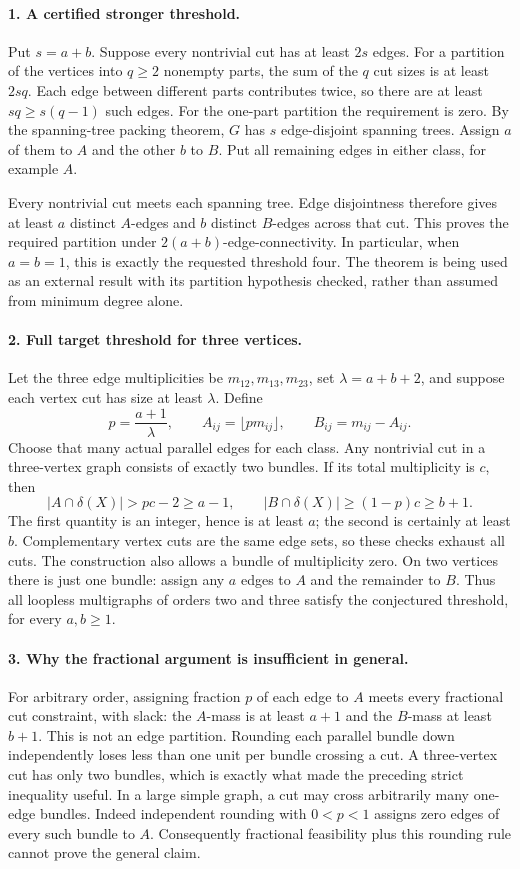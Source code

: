 \documentclass[11pt,a4paper]{article}
\begin{document}
\paragraph{1. A certified stronger threshold.}
Put $s=a+b$. Suppose every nontrivial cut has at least $2s$ edges.
For a partition of the vertices into $q\ge2$ nonempty parts, the sum
of the $q$ cut sizes is at least $2sq$. Each edge between different
parts contributes twice, so there are at least $sq\ge s(q-1)$
such edges. For the one-part partition the requirement is zero.
By the spanning-tree packing theorem, $G$ has $s$ edge-disjoint
spanning trees. Assign $a$ of them to $A$ and the other $b$ to $B$.
Put all remaining edges in either class, for example $A$.

Every nontrivial cut meets each spanning tree. Edge disjointness
therefore gives at least $a$ distinct $A$-edges and $b$ distinct
$B$-edges across that cut. This proves the required partition under
$2(a+b)$-edge-connectivity. In particular, when $a=b=1$, this is exactly
the requested threshold four. The theorem is being used as an external
result with its partition hypothesis checked, rather than assumed from
minimum degree alone.

\paragraph{2. Full target threshold for three vertices.}
Let the three edge multiplicities be $m_{12},m_{13},m_{23}$, set
$\lambda=a+b+2$, and suppose each vertex cut has size at least
$\lambda$. Define
\[
 p=\frac{a+1}{\lambda},\qquad
 A_{ij}=\lfloor p m_{ij}\rfloor,\qquad
 B_{ij}=m_{ij}-A_{ij}.
\]
Choose that many actual parallel edges for each class. Any nontrivial
cut in a three-vertex graph consists of exactly two bundles. If its
total multiplicity is $c$, then
\[
 |A\cap\delta(X)|>pc-2\ge a-1,
 \qquad |B\cap\delta(X)|\ge(1-p)c\ge b+1.
\]
The first quantity is an integer, hence is at least $a$; the second
is certainly at least $b$. Complementary vertex cuts are the same
edge sets, so these checks exhaust all cuts. The construction also
allows a bundle of multiplicity zero. On two vertices there is just
one bundle: assign any $a$ edges to $A$ and the remainder to $B$.
Thus all loopless multigraphs of orders two and three satisfy the
conjectured threshold, for every $a,b\ge1$.

\paragraph{3. Why the fractional argument is insufficient in general.}
For arbitrary order, assigning fraction $p$ of each edge to $A$ meets
every fractional cut constraint, with slack: the $A$-mass is at least
$a+1$ and the $B$-mass at least $b+1$. This is not an edge partition.
Rounding each parallel bundle down independently loses less than one
unit per bundle crossing a cut. A three-vertex cut has only two
bundles, which is exactly what made the preceding strict inequality
useful. In a large simple graph, a cut may cross arbitrarily many
one-edge bundles. Indeed independent rounding with $0<p<1$ assigns
zero edges of every such bundle to $A$. Consequently fractional
feasibility plus this rounding rule cannot prove the general claim.
\end{document}
